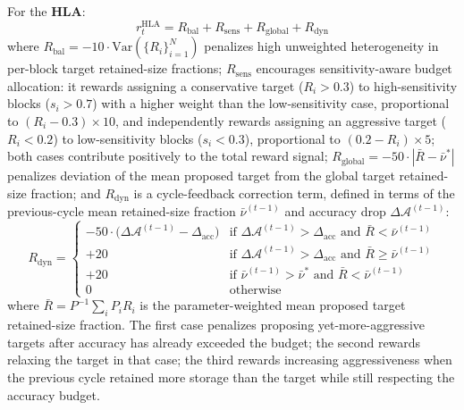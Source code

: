 \documentclass[preprint,12pt,authoryear]{elsarticle}
\begin{document}
For the \textbf{HLA}:
\begin{equation}
    r_t^{\mathrm{HLA}} = R_{\mathrm{bal}} + R_{\mathrm{sens}} + R_{\mathrm{global}} + R_{\mathrm{dyn}}
    \label{eq:hla_reward}
\end{equation}
where $R_{\mathrm{bal}} = -10\cdot\mathrm{Var}(\{R_i\}_{i=1}^N)$ penalizes
high unweighted heterogeneity in per-block target retained-size fractions;
$R_{\mathrm{sens}}$ encourages sensitivity-aware budget allocation: it rewards
assigning a conservative target ($R_i > 0.3$) to high-sensitivity blocks ($s_i > 0.7$)
with a higher weight than the low-sensitivity case, proportional to
$(R_i-0.3)\times 10$, and independently rewards assigning an aggressive target
($R_i < 0.2$) to low-sensitivity blocks ($s_i < 0.3$), proportional to
$(0.2-R_i)\times 5$; both cases contribute positively to the total reward signal;
$R_{\mathrm{global}} = -50\cdot|\bar{R} - \bar{\nu}^*|$ penalizes deviation of the
mean proposed target from the global target retained-size fraction; and $R_{\mathrm{dyn}}$ is a
cycle-feedback correction term, defined in terms of the previous-cycle mean retained-size fraction
$\bar{\nu}^{(t-1)}$ and accuracy drop $\Delta\mathcal{A}^{(t-1)}$:
\begin{equation}
    R_{\mathrm{dyn}} = \begin{cases}
        -50\cdot\bigl(\Delta\mathcal{A}^{(t-1)} - \Delta_{\mathrm{acc}}\bigr)
        & \text{if } \Delta\mathcal{A}^{(t-1)} > \Delta_{\mathrm{acc}}
          \text{ and } \bar{R} < \bar{\nu}^{(t-1)} \\
        +20
        & \text{if } \Delta\mathcal{A}^{(t-1)} > \Delta_{\mathrm{acc}}
          \text{ and } \bar{R} \geq \bar{\nu}^{(t-1)} \\
        +20
        & \text{if } \bar{\nu}^{(t-1)} > \bar{\nu}^* \text{ and }
          \bar{R} < \bar{\nu}^{(t-1)} \\
        0 & \text{otherwise}
    \end{cases}
    \label{eq:rdyn}
\end{equation}
where $\bar{R}=P^{-1}\sum_i P_iR_i$ is the parameter-weighted mean proposed target
retained-size fraction. The first case penalizes proposing yet-more-aggressive targets after accuracy
has already exceeded the budget; the second rewards relaxing the target in that case;
the third rewards increasing aggressiveness when the previous cycle retained more
storage than the target while still respecting the accuracy budget.
\end{document}
